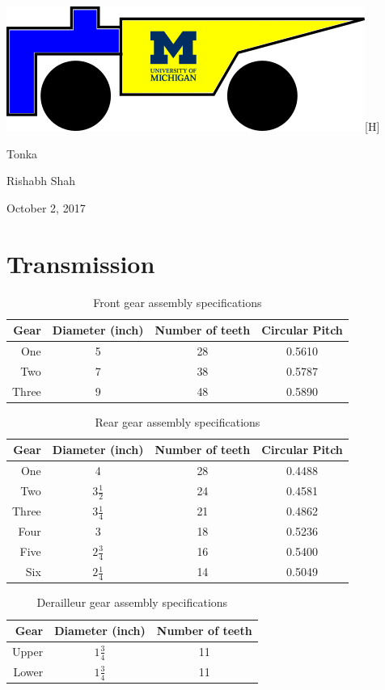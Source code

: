 \documentclass[11pt]{article}
\begin{document}
{\large\noindent \includegraphics{Logo}[H]

\noindent Tonka

\noindent Rishabh Shah

\noindent October 2, 2017}

\section*{Transmission}
\begin{table}[H]
	\centering
	\begin{tabular}{|r|c|c|c|}
		\hline
		\textbf{Gear} & \textbf{Diameter (inch)} & \textbf{Number of teeth} & \textbf{Circular Pitch}\\
		\hline
		One & 5 & 28 & 0.5610 \\
		\hline
		Two & 7 & 38 & 0.5787 \\
		\hline
		Three & 9 & 48 & 0.5890 \\
		\hline
	\end{tabular}
	\caption{Front gear assembly specifications}
\end{table}
\begin{table}[H]
	\centering
	\begin{tabular}{|r|c|c|c|}
		\hline
		\textbf{Gear} & \textbf{Diameter (inch)} & \textbf{Number of teeth} & \textbf{Circular Pitch} \\
		\hline
		One & 4 & 28 & 0.4488 \\
		\hline
		Two & \(3\frac{1}{2}\) & 24 & 0.4581 \\
		\hline
		Three & \(3\frac{1}{4}\) & 21 & 0.4862 \\
		\hline
		Four & 3 & 18 & 0.5236 \\
		\hline
		Five & \(2\frac{3}{4}\) & 16 & 0.5400 \\
		\hline
		Six & \(2\frac{1}{4}\) & 14 & 0.5049 \\
		\hline
	\end{tabular}
	\caption{Rear gear assembly specifications}
\end{table}
\begin{table}[H]
	\centering
	\begin{tabular}{|r|c|c|}
		\hline
		\textbf{Gear} & \textbf{Diameter (inch)} & \textbf{Number of teeth} \\
		\hline
		Upper & \(1\frac{3}{4}\) & 11 \\
		\hline
		Lower & \(1\frac{3}{4}\) & 11 \\
		\hline
	\end{tabular}
	\caption{Derailleur gear assembly specifications}
\end{table}
\end{document}
